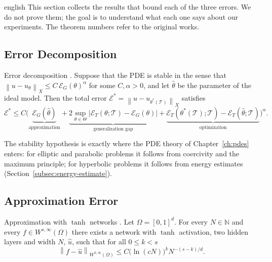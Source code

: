 \documentclass[12pt,letterpaper,twoside]{book}
\newcommand{\norm}[1]{\left\lVert #1 \right\rVert}
\newcommand{\abs}[1]{\left\lvert #1 \right\rvert}
\newcommand{\T}{\mathcal{T}}
\newif\ifreviewmode
\newcommand{\revtag}[2]{\ifreviewmode{\color{red!70!black}\textsf{\footnotesize[#1#2]}}\fi}
\newcommand{\verificar}[1]{\revtag{VERIFICAR}{: #1}}
\begin{document}
\begin{hyphenrules}{english}
This section collects the results that bound each of the three errors. We do not prove them; the goal
is to understand what each one says about our experiments. The theorem numbers refer to the original
works.\verificar{theorem/lemma numbers against the published versions}

\subsection{Error Decomposition}

\begin{teorema}{Error decomposition \cite[Lemma~3.1 and Eq.~3.11]{deryck2022generic,deryck2024acta}.}\label{thm:error-decomp}
Suppose that the PDE is stable in the sense that $\norm{u-u_\theta}_X\le C\,\mathcal{E}_G(\theta)^{\alpha}$
for some $C,\alpha>0$, and let $\hat\theta$ be the parameter of the ideal model. Then the total error
$\mathcal{E}^{*}=\norm{u-u_{\theta^{*}(\T)}}_X$ satisfies
\[
  \mathcal{E}^{*}\le C\Big(\underbrace{\mathcal{E}_G(\hat\theta)}_{\text{approximation}}
  +\underbrace{2\sup_{\theta\in\Theta}\abs{\mathcal{E}_T(\theta;\T)-\mathcal{E}_G(\theta)}}_{\text{generalization gap}}
  +\underbrace{\mathcal{E}_T(\theta^{*}(\T);\T)-\mathcal{E}_T(\hat\theta;\T)}_{\text{optimization}}\Big)^{\alpha}.
\]
\end{teorema}

The stability hypothesis is exactly where the PDE theory of Chapter~\ref{ch:pdes} enters: for elliptic and
parabolic problems it follows from coercivity and the maximum principle; for hyperbolic problems it
follows from energy estimates (Section~\ref{subsec:energy-estimate}).

\subsection{Approximation Error}

\begin{teorema}{Approximation with $\tanh$ networks \cite[Theorem~4.4]{deryck2021tanh}.}\label{thm:tanh-approx}
Let $\Omega=[0,1]^d$. For every $N\in\mathbb{N}$ and every $f\in W^{s,\infty}(\Omega)$ there exists a network
with $\tanh$ activation, two hidden layers and width $N$, $\hat u$, such that for all $0\le k<s$
\[
  \norm{f-\hat u}_{W^{k,\infty}(\Omega)}\le C\big(\ln(cN)\big)^{k}N^{-(s-k)/d}.
\]
\end{teorema}


\end{hyphenrules}
\end{document}

